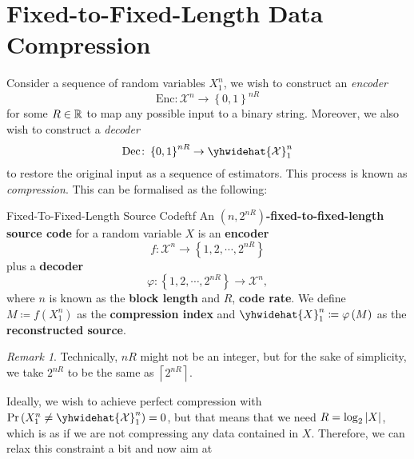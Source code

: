 \documentclass[math, code]{amznotes}
\theoremstyle{remark}
\newtheorem*{remark}{Remark}
\begin{document}
\section{Fixed-to-Fixed-Length Data Compression}
Consider a sequence of random variables $X_1^n$, we wish to construct an \textit{encoder} 
\begin{equation*}
    \mathrm{Enc} \colon \mathcal{X}^n \to \left\{0, 1\right\}^{nR}
\end{equation*}
for some $R \in \mathbb{R}$ to map any possible input to a binary string. Moreover, we also wish to construct a \textit{decoder}
\begin{equation*}
    \mathrm{Dec} \colon \left\{0, 1\right\}^{nR} \to \yhwidehat{\mathcal{X}}_1^n
\end{equation*}
to restore the original input as a sequence of estimators. This process is known as \textit{compression}. This can be formalised as the following:
\begin{dfnbox}{Fixed-To-Fixed-Length Source Code}{ftf}
    An {\color{red} \textbf{$\left(n, 2^{nR}\right)$-fixed-to-fixed-length source code}} for a random variable $X$ is an {\color{red} \textbf{encoder}}
    \begin{equation*}
        f \colon \mathcal{X}^n \to \left\{1, 2, \cdots, 2^{nR}\right\}
    \end{equation*}
    plus a {\color{red} \textbf{decoder}}
    \begin{equation*}
        \varphi \colon \left\{1, 2, \cdots, 2^{nR}\right\} \to \mathcal{X}^n,
    \end{equation*}
    where $n$ is known as the {\color{red} \textbf{block length}} and $R$, {\color{red} \textbf{code rate}}. We define $M \coloneqq f\left(X_1^n\right)$ as the {\color{red} \textbf{compression index}} and $\yhwidehat{X}_1^n \coloneqq \varphi\left(M\right)$ as the {\color{red} \textbf{reconstructed source}}.
\end{dfnbox}
\begin{notebox}
    \begin{remark}
        Technically, $nR$ might not be an integer, but for the sake of simplicity, we take $2^{nR}$ to be the same as $\left\lceil 2^{nR}\right\rceil$.
    \end{remark}
\end{notebox}
Ideally, we wish to achieve perfect compression with $\Pr\left(X_1^n \neq \yhwidehat{\mathcal{X}}_1^n\right) = 0$, but that means that we need $R = \log_2{\left\lvert {X} \right\rvert}$, which is as if we are not compressing any data contained in $X$. Therefore, we can relax this constraint a bit and now aim at 
\end{document}
